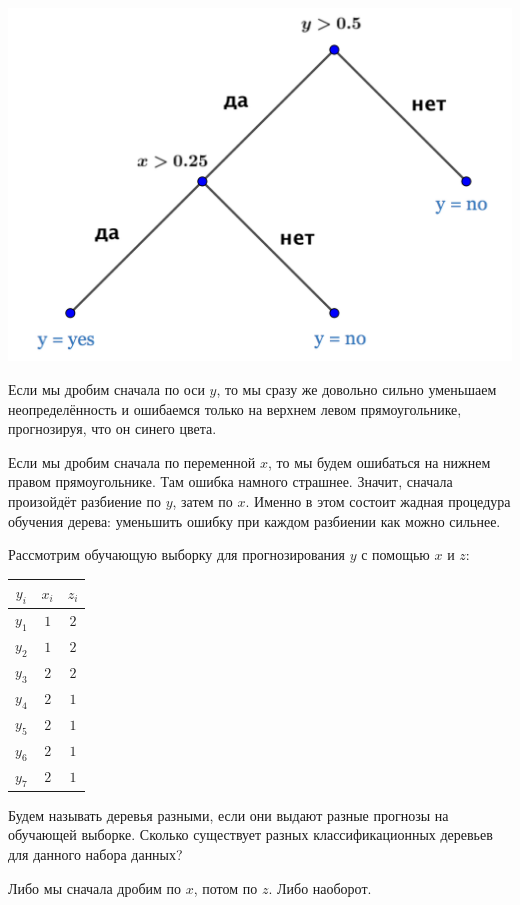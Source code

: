 \documentclass[12pt, a4paper, oneside]{article}
\theoremstyle{plain} %
\theoremstyle{definition}
\begin{document}
\begin{solution}
\begin{center}
	\includegraphics[scale=0.2]{class_tree_3.png}
\end{center} 	
	
Если мы дробим сначала по оси $y$, то мы сразу же довольно сильно уменьшаем неопределённость и ошибаемся только на верхнем левом прямоугольнике, прогнозируя, что он синего цвета. 
	
Если мы дробим сначала по переменной $x$, то мы будем ошибаться на нижнем правом прямоугольнике. Там ошибка намного страшнее. Значит, сначала произойдёт разбиение по $y$, затем по $x$. Именно в этом состоит жадная процедура обучения дерева: уменьшить ошибку при каждом разбиении как можно сильнее. 
\end{solution}

\begin{problem}{}
Рассмотрим обучающую выборку для прогнозирования $y$ с помощью $x$ и $z$:

\begin{center}
	\begin{tabular}{c|c|c}
		$y_i$ & $x_i$ & $z_i$ \\
		\hline
		$y_1$ & $1$ & $2$ \\
		$y_2$ & $1$ & $2$ \\
		$y_3$ & $2$ & $2$ \\
		$y_4$ & $2$ & $1$\\
		$y_5$ & $2$ & $1$ \\
		$y_6$ & $2$ & $1$ \\
		$y_7$ & $2$ & $1$ \\
	\end{tabular}
\end{center}

Будем называть деревья разными, если они выдают разные прогнозы на обучающей выборке. Сколько существует разных классификационных деревьев  для данного набора данных?
\end{problem}

\begin{solution}
Либо мы сначала дробим по $x$, потом по $z$. Либо наоборот. 	\end{solution}
\end{document}
